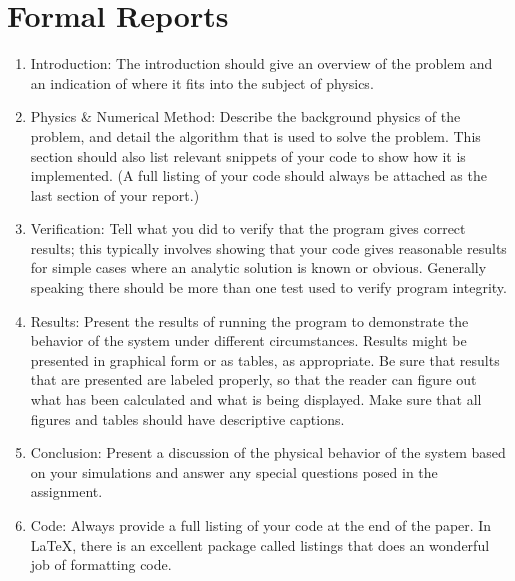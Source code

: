 \section{Formal Reports}\label{sec:formal}
\begin{enumerate}
\item{Introduction:}  The introduction should give an overview of the problem and an indication of where it fits into the subject of physics.
\item{Physics \& Numerical Method:} Describe the background physics of the problem, and detail the algorithm that is used to solve the problem. This section should also list relevant snippets of your code to show how it is implemented.  (A full listing of your code should always be attached as the last section of your report.)
\item{Verification:} Tell what you did to verify that the program gives correct results; this typically involves showing that your code gives reasonable results for simple cases where an analytic solution is known or obvious.  Generally speaking there should be more than one test used to verify program integrity. 
\item{Results:} Present the results of running the program to demonstrate the behavior of the system under different circumstances. Results might be presented in graphical form or as tables, as appropriate. Be sure that results that are presented are labeled properly, so that the reader can figure out what has been calculated and what is being displayed. Make sure that all figures and tables should have descriptive captions.
\item{Conclusion:} Present a discussion of the physical behavior of the system based on your simulations and answer any special questions posed in the assignment.
\item{Code:} Always provide a full listing of your code at the end of the paper. In LaTeX, there is an excellent package called listings that does an wonderful job of formatting code.
 \end{enumerate}

